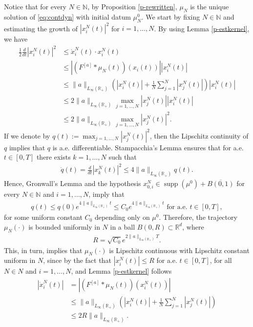 \documentclass[A4paper,11pt]{article}
\theoremstyle{definition}
\newcommand{\N}{\mathbb{N}}
\newcommand{\R}{\mathbb{R}}
\DeclareMathOperator{\supp}{supp}
\newcommand{\Fun}[1]{F^{[#1]}}
\begin{document}
Notice that for every $N \in \N$, by Proposition \ref{p-rewritten}, $\mu_N$ is the unique solution of \eqref{eq:contdyn} with initial datum $\mu_N^0$. We start by fixing $N \in \N$ and estimating the growth of $|x_i^N(t)|^2$ for $i = 1, \ldots, N$. By using Lemma \ref{p-estkernel}, we have
\begin{align*}
\frac{1}{2}\frac{d}{dt} |x_i^N(t)|^2 & \leq \dot{x}_i^N(t) \cdot x_i^N(t) \\
& \leq \left|(\Fun{a}*\mu_N(t))(x_i(t))\right| |x_i^N(t)| \\
& \leq \|a\|_{L_{\infty}(\R_+)}\left( |x_i^N(t)| + \frac{1}{N} \sum^N_{j = 1}|x_j^N(t)| \right) |x_i^N(t)| \\
& \leq 2 \|a\|_{L_{\infty}(\R_+)}\max_{j = 1, \ldots, N} |x_j^N(t)| |x_i^N(t)| \\
& \leq 2 \|a\|_{L_{\infty}(\R_+)}\max_{j = 1, \ldots, N} |x_j^N(t)|^2.
\end{align*}
If we denote by $q(t) := \max_{j = 1, \ldots, N} |x_j^N(t)|^2$, then the Lipschitz continuity of $q$ implies that $q$ is a.e. differentiable. Stampacchia's Lemma \cite[Chapter 2, Lemma A.4]{Kin-Sta} ensures that for a.e. $t \in [0,T]$ there exists $k = 1, \ldots, N$ such that
\begin{align*}
\dot{q}(t) = \frac{d}{dt} |x_k^N(t)|^2 \leq 4 \|a\|_{L_{\infty}(\R_+)} q(t).
\end{align*}
Hence, Gronwall's Lemma and the hypothesis $x^{N}_{0,i} \in \supp(\mu^0) + \overline{B(0,1)}$ for every $N \in \N$ and $i = 1, \ldots, N$, imply that
\begin{align*}
q(t) \leq q(0) e^{4 \|a\|_{L_{\infty}(\R_+)} t} \leq C_0 e^{4 \|a\|_{L_{\infty}(\R_+)} t} \text{ for a.e. } t \in [0,T],
\end{align*}
for some uniform constant $C_0$ depending only on $\mu^0$. Therefore, the trajectory $\mu_N(\cdot)$ is bounded uniformly in $N$ in a ball $B(0,R) \subset \R^d$, where
\begin{align}\label{Rest}
R =  \sqrt{C_0} e^{2 \|a\|_{L_{\infty}(\R_+)} T}.
\end{align}
This, in turn, implies that $\mu_N(\cdot)$ is Lipschitz continuous with Lipschitz constant uniform in $N$, since by the fact that $|x^N_i(t)| \leq R$ for a.e. $t \in [0,T]$, for all $N \in N$ and $i = 1, \ldots, N$, and Lemma \ref{p-estkernel} follows
\begin{align*}
|\dot{x}^N_i(t)| &= |(\Fun{a}*\mu_N(t))(x^N_i(t))| \\
&\leq \|a\|_{L_{\infty}(\R_+)} \left( |x^N_i(t)| + \frac{1}{N}\sum^N_{j = 1}|x^N_j(t)|\right) \\
&\leq 2R\|a\|_{L_{\infty}(\R_+)}.
\end{align*}
\end{document}
